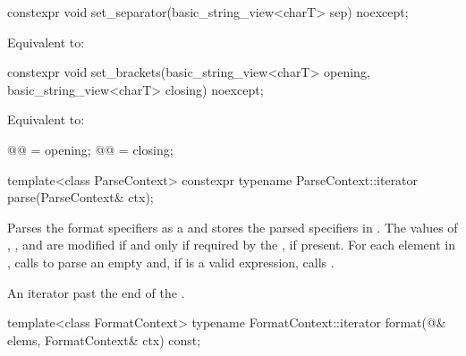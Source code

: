 %
\begin{itemdecl}
constexpr void set_separator(basic_string_view<charT> sep) noexcept;
\end{itemdecl}

\begin{itemdescr}
\pnum
\effects
Equivalent to: 
\end{itemdescr}

%
\begin{itemdecl}
constexpr void set_brackets(basic_string_view<charT> opening,
                            basic_string_view<charT> closing) noexcept;
\end{itemdecl}

\begin{itemdescr}
\pnum
\effects
Equivalent to:
\begin{codeblock}
@@ = opening;
@@ = closing;
\end{codeblock}
\end{itemdescr}

%
\begin{itemdecl}
template<class ParseContext>
  constexpr typename ParseContext::iterator
    parse(ParseContext& ctx);
\end{itemdecl}

\begin{itemdescr}
\pnum
\effects
Parses the format specifiers as a  and
stores the parsed specifiers in .
The values of
,
, and
are modified if and only if
required by the , if present.
For each element  in ,
calls  to parse
an empty  and,
if  is a valid expression,
calls .

\pnum
\returns
An iterator past the end of the .
\end{itemdescr}

%
\begin{itemdecl}
template<class FormatContext>
  typename FormatContext::iterator
    format(@\seebelow@& elems, FormatContext& ctx) const;
\end{itemdecl}

